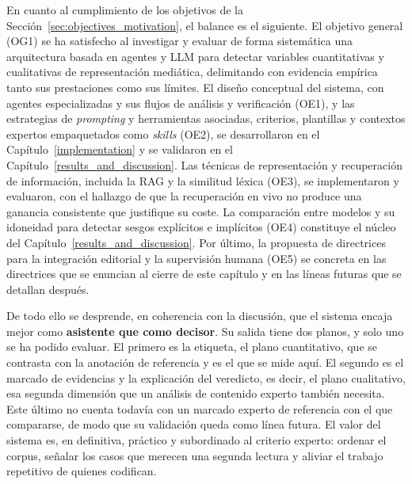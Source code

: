 En cuanto al cumplimiento de los objetivos de la Sección~\ref{sec:objectives_motivation},
el balance es el siguiente. El objetivo general (OG1) se ha satisfecho al investigar y
evaluar de forma sistemática una arquitectura basada en agentes y LLM para detectar
variables cuantitativas y cualitativas de representación mediática, delimitando con evidencia empírica
tanto sus prestaciones como sus límites. El diseño conceptual del sistema, con agentes
especializadas y sus flujos de análisis y verificación (OE1), y las estrategias de
\textit{prompting} y herramientas asociadas, criterios, plantillas y contextos expertos
empaquetados como \textit{skills} (OE2), se desarrollaron en el
Capítulo~\ref{implementation} y se validaron en el Capítulo~\ref{results_and_discussion}.
Las técnicas de representación y recuperación de información, incluida la RAG y la
similitud léxica (OE3), se implementaron y evaluaron, con el hallazgo de que la recuperación
en vivo no produce una ganancia consistente que justifique su coste. La comparación
entre modelos y su idoneidad para detectar sesgos explícitos e implícitos (OE4)
constituye el núcleo del Capítulo~\ref{results_and_discussion}. Por último, la propuesta
de directrices para la integración editorial y la supervisión humana (OE5) se concreta
en las directrices que se enuncian al cierre de este capítulo y en las líneas futuras
que se detallan después.

De todo ello se desprende, en coherencia con la discusión, que el sistema encaja mejor
como \textbf{asistente que como decisor}. Su salida tiene dos planos, y solo uno se ha
podido evaluar. El primero es la etiqueta, el plano cuantitativo, que se contrasta con
la anotación de referencia y es el que se mide aquí. El segundo es el marcado de
evidencias y la explicación del veredicto, es decir, el plano cualitativo, esa segunda dimensión
que un análisis de contenido experto también necesita. Este último no cuenta todavía
con un marcado experto de referencia con el que compararse, de modo que su validación
queda como línea futura. El valor del sistema es, en definitiva, práctico y subordinado
al criterio experto: ordenar el corpus, señalar los casos que merecen una segunda
lectura y aliviar el trabajo repetitivo de quienes codifican.

